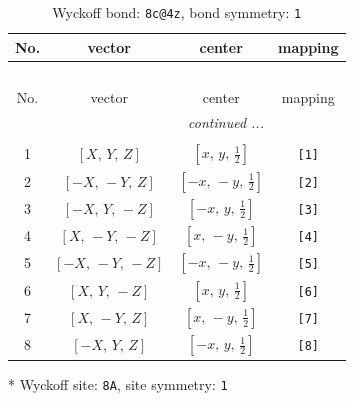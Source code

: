 \documentclass[fleqn,8pt]{jsarticle}
\begin{document}
\renewcommand{\arraystretch}{1.2}
\begin{longtable}{cccc}
\caption{Wyckoff bond: {\tt 8c@4z}, bond symmetry: {\tt 1}}
 \\
 \hline \hline
No. & vector & center & mapping \\ \hline \endfirsthead

\multicolumn{3}{l}{\tablename\ \thetable{}} \\
 \hline \hline
No. & vector & center & mapping \\ \hline \endhead

 \hline \hline
\multicolumn{3}{r}{\footnotesize\it continued ...} \\ \endfoot

 \hline \hline
\multicolumn{3}{r}{} \\ \endlastfoot

1 & $\left[ X,\, Y,\, Z \right]$ & $\left[ x,\, y,\, \frac{1}{2} \right]$ & {\tt [1]} \\ \hline
2 & $\left[ - X,\, - Y,\, Z \right]$ & $\left[ - x,\, - y,\, \frac{1}{2} \right]$ & {\tt [2]} \\ \hline
3 & $\left[ - X,\, Y,\, - Z \right]$ & $\left[ - x,\, y,\, \frac{1}{2} \right]$ & {\tt [3]} \\ \hline
4 & $\left[ X,\, - Y,\, - Z \right]$ & $\left[ x,\, - y,\, \frac{1}{2} \right]$ & {\tt [4]} \\ \hline
5 & $\left[ - X,\, - Y,\, - Z \right]$ & $\left[ - x,\, - y,\, \frac{1}{2} \right]$ & {\tt [5]} \\ \hline
6 & $\left[ X,\, Y,\, - Z \right]$ & $\left[ x,\, y,\, \frac{1}{2} \right]$ & {\tt [6]} \\ \hline
7 & $\left[ X,\, - Y,\, Z \right]$ & $\left[ x,\, - y,\, \frac{1}{2} \right]$ & {\tt [7]} \\ \hline
8 & $\left[ - X,\, Y,\, Z \right]$ & $\left[ - x,\, y,\, \frac{1}{2} \right]$ & {\tt [8]} \\
\end{longtable}
* Wyckoff site: {\tt 8A}, site symmetry: {\tt 1}
\renewcommand{\arraystretch}{1.2}
\end{document}
